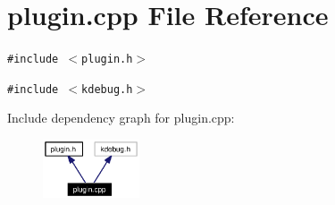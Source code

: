 \section{plugin.cpp File Reference}
\label{plugin_8cpp}


{\tt \#include $<$plugin.h$>$}\par
{\tt \#include $<$kdebug.h$>$}\par


Include dependency graph for plugin.cpp:\begin{figure}[H]
\begin{center}
\leavevmode
\includegraphics[width=81pt]{plugin_8cpp__incl}
\end{center}
\end{figure}
